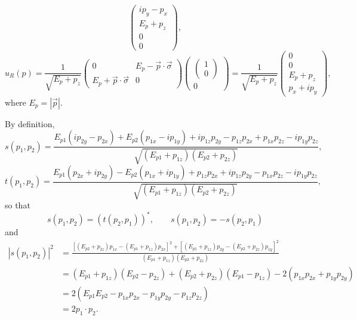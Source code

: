 \begin{problembody}
\begin{equation*}
\begin{pmatrix}
            ip_y - p_x \\
            E_p + p_z \\
            0 \\
            0
        \end{pmatrix},
    \end{equation*}
    \begin{equation*}
        u_R(p) = \frac{1}{\sqrt{E_p + p_z}} \begin{pmatrix}
            0 & E_p - \vec{p}\cdot\vec{\sigma} \\
            E_p + \vec{p}\cdot\vec{\sigma} & 0
        \end{pmatrix} \begin{pmatrix}
            \begin{pmatrix}
                1 \\ 0
            \end{pmatrix} \\
            0
        \end{pmatrix} = \frac{1}{\sqrt{E_p + p_z}} \begin{pmatrix}
            0 \\
            0 \\
            E_p + p_z \\
            p_x + ip_y
        \end{pmatrix},
    \end{equation*}
    where $E_p = |\vec{p}|$.

    \item By definition,
    \begin{equation*}
        s(p_1, p_2) = \frac{
            E_{p1}(ip_{2y} - p_{2x}) + E_{p2}(p_{1x} - ip_{1y}) + ip_{1z}p_{2y}
         - p_{1z}p_{2x} + p_{1x}p_{2z} - ip_{1y}p_{2z}
        } {\sqrt{(E_{p1} + p_{1z})(E_{p2} + p_{2z})}},
    \end{equation*}
    \begin{equation*}
        t(p_1, p_2) = \frac{
            E_{p1}(p_{2x} + ip_{2y}) - E_{p2}(p_{1x} + ip_{1y}) + p_{1z}p_{2x}
         + ip_{1z}p_{2y} - p_{1x}p_{2z} - ip_{1y}p_{2z}
        } {\sqrt{(E_{p1} + p_{1z})(E_{p2} + p_{2z})}},
    \end{equation*}
    so that
    \begin{equation*}
        s(p_1, p_2) = (t(p_2, p_1))^\ast, \qquad s(p_1, p_2) = -s(p_2, p_1)
    \end{equation*}
    and 
    \begin{align*}
        \left| s(p_1, p_2) \right|^2 & = \frac{
            \left[(E_{p2} + p_{2z})p_{1x} - (E_{p1} + p_{1z})p_{2x}\right]^2 
            + \left[(E_{p1} + p_{1z})p_{2y} - (E_{p2} + p_{2z})p_{1y}\right]^2
        }
        {(E_{p1} + p_{1z})(E_{p2} + p_{2z})} \\
        & = (E_{p1} + p_{1z})(E_{p2} - p_{2z}) + (E_{p2} + p_{2z})(E_{p1} - p_{1z}) - 2(p_{1x}p_{2x} + p_{1y}p_{2y}) \\
        & = 2(E_{p1}E_{p2} - p_{1x}p_{2x} - p_{1y}p_{2y} - p_{1z}p_{2z})\\
        & = 2 p_1 \cdot p_2.
    \end{align*}
\end{problembody}

